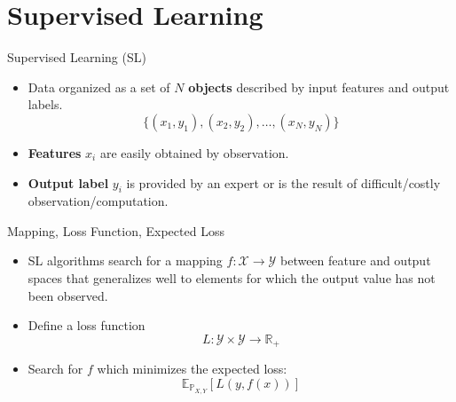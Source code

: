 \section{Supervised Learning}

\begin{frame}{Supervised Learning (SL)}
  \begin{itemize}
    \item Data organized as a set of $N$ \textbf{objects} described by input features and output labels.
    $$\{(x_1, y_1), (x_2, y_2), \dots, (x_N, y_N)\} $$
    \item \textbf{Features} $x_i$ are easily obtained by observation.
    \item \textbf{Output label} $y_i$ is provided by an expert or is the result of difficult/costly observation/computation.
  \end{itemize}
\end{frame}

\begin{frame}{Mapping, Loss Function, Expected Loss}
  \begin{itemize}
    \item SL algorithms search for a mapping $f : \mathcal{X} \rightarrow \mathcal{Y}$ between feature and output spaces that generalizes well to elements for which the output value has not been observed.
    \item Define a loss function $$ L: \mathcal{Y} \times \mathcal{Y}  \rightarrow \mathbb{R}_+$$
    \item Search for $f$ which minimizes the expected loss:
      \[ \mathbb{E}_{\mathbb{P}_{X,Y}}[L(y, f(x))] \]
  \end{itemize}
\end{frame}

